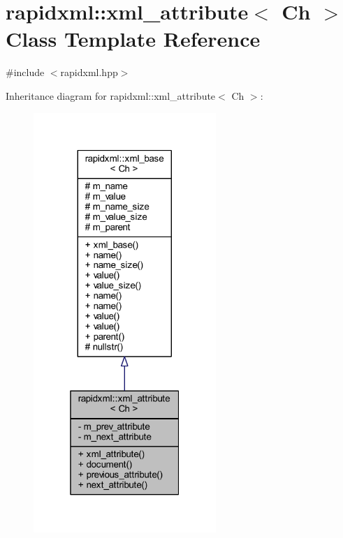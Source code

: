 \hypertarget{singletonrapidxml_1_1xml__attribute}{\section{rapidxml\+:\+:xml\+\_\+attribute$<$ Ch $>$ Class Template Reference}
\label{singletonrapidxml_1_1xml__attribute}
}


{\ttfamily \#include $<$rapidxml.\+hpp$>$}



Inheritance diagram for rapidxml\+:\+:xml\+\_\+attribute$<$ Ch $>$\+:\nopagebreak
\begin{figure}[H]
\begin{center}
\leavevmode
\includegraphics[width=196pt]{singletonrapidxml_1_1xml__attribute__inherit__graph}
\end{center}
\end{figure}


